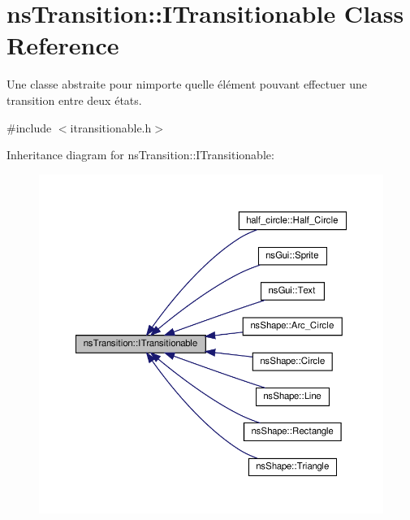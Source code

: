 \hypertarget{classns_transition_1_1_i_transitionable}{}\section{ns\+Transition\+:\+:I\+Transitionable Class Reference}
\label{classns_transition_1_1_i_transitionable}


Une classe abstraite pour n\textquotesingle{}importe quelle élément pouvant effectuer une transition entre deux états.  




{\ttfamily \#include $<$itransitionable.\+h$>$}



Inheritance diagram for ns\+Transition\+:\+:I\+Transitionable\+:
\nopagebreak
\begin{figure}[H]
\begin{center}
\leavevmode
\includegraphics[width=350pt]{classns_transition_1_1_i_transitionable__inherit__graph}
\end{center}
\end{figure}
